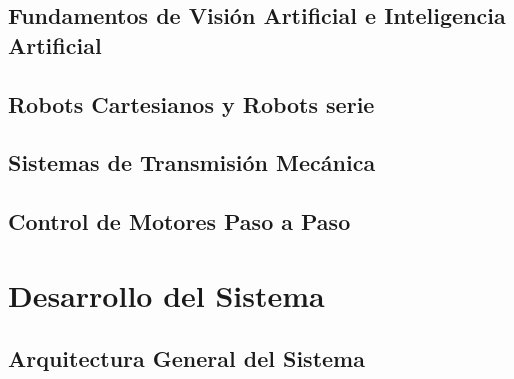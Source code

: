 \documentclass[a4paper,12pt]{report}
\begin{document}
\section{Fundamentos de Visión Artificial e Inteligencia Artificial}




%

\section{Robots Cartesianos y Robots serie}
%
%
%


\section{Sistemas de Transmisión Mecánica}


\section{Control de Motores Paso a Paso}

%
%

\chapter{Desarrollo del Sistema}

\section{Arquitectura General del Sistema}




\end{document}

